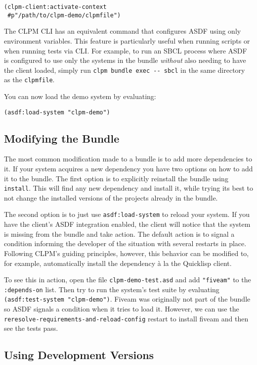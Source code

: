 \documentclass[format=sigconf]{acmart}
\begin{document}
\begin{verbatim}
(clpm-client:activate-context
 #p"/path/to/clpm-demo/clpmfile")
\end{verbatim}

The CLPM CLI has an equivalent command that configures ASDF using only
environment variables. This feature is particularly useful when running scripts
or when running tests via CLI. For example, to run an SBCL process where ASDF
is configured to use only the systems in the bundle {\it without} also needing
to have the client loaded, simply run {\tt clpm bundle exec -{}- sbcl} in the
same directory as the {\tt clpmfile}.

You can now load the demo system by evaluating:
\begin{verbatim}
(asdf:load-system "clpm-demo")
\end{verbatim}

\subsection{Modifying the Bundle}

The most common modification made to a bundle is to add more dependencies to
it. If your system acquires a new dependency you have two options on how to add
it to the bundle. The first option is to explicitly reinstall the bundle using
{\tt install}. This will find any new dependency and install it, while trying
its best to not change the installed versions of the projects already in the
bundle.

The second option is to just use {\tt asdf:load-system} to reload your
system. If you have the client's ASDF integration enabled, the client will
notice that the system is missing from the bundle and take action. The default
action is to signal a condition informing the developer of the situation with
several restarts in place. Following CLPM's guiding principles, however, this
behavior can be modified to, for example, automatically install the dependency
\`a la the Quicklisp client.

To see this in action, open the file {\tt clpm-demo-test.asd} and add
\verb|"fiveam"| to the \verb|:depends-on| list. Then try to run the system's
test suite by evaluating \verb|(asdf:test-system "clpm-demo")|. Fiveam was
originally not part of the bundle so ASDF signals a condition when it tries to
load it. However, we can use the
\verb|reresolve-requirements-and-reload-config| restart to install fiveam and
then see the tests pass.

\subsection{Using Development Versions}
\end{document}
